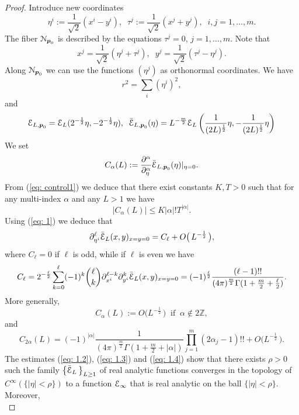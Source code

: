 \documentclass[reqno, 11pt]{amsart}
\theoremstyle{definition}
\numberwithin{equation}{section}
\begin{document}
\begin{proof}
Introduce   new coordinates 
\[
\eta^i:=\frac{1}{\sqrt{2}}(x^i-y^i), \;\;\tau^j:=\frac{1}{\sqrt{2}}(x^j+y^j),\;\; i,j=1,\dotsc, m.
\]
The  fiber ${\EuScript{N}}_{{{\boldsymbol{p}}}_0}$ is described by the  equations $\tau^j=0$, $j=1,\dotsc, m$.  Note that
\[
x^j =\frac{1}{\sqrt{2}}(\eta^j+\tau^j),\;\; y^j=\frac{1}{\sqrt{2}}(\tau^j-\eta^j).
\]
Along ${\EuScript{N}}_{{{\boldsymbol{p}}}_0}$  we can use the functions $(\eta^j)$ as orthonormal coordinates. We have 
\[
r^2=\sum_i(\eta^i)^2,
\]
and
\[
{\EuScript{E}}_{L,{{\boldsymbol{p}}}_0}= {\EuScript{E}}_L( 2^{-\frac{1}{2}} \eta, -2^{-\frac{1}{2}}\eta),\;\;\bar{\EuScript{E}}_{L,{{\boldsymbol{p}}}_0}(\eta)= L^{-\frac{m}{2}}{\EuScript{E}}_L\left( \frac{1}{(2L)^{\frac{1}{2}}} \eta, -\frac{1}{(2L)^{\frac{1}{2}}}\eta\right)
\]
We set
\[
C_{\alpha}(L):=\frac{{\partial}^\alpha}{{\partial}_\eta^\alpha}\bar{\EuScript{E}}_{L,{{\boldsymbol{p}}}_0}(\eta)|_{\eta=0}.
\]
From (\ref{eq: control1}) we deduce that there exist constants $K, T>0$  such that for any  multi-index $\alpha$ and any  $L>1$ we have 
\begin{equation}
\left|C_{\alpha}(L)\right|\leq K|\alpha|! T^{|\alpha|}.
\label{eq: 1.2}
\end{equation}
Using (\ref{eq: 1}) we deduce that
\[
{\partial}^\ell_{\eta^i} \bar{\EuScript{E}}_L(x,y)_{x=y=0}= C_\ell+O\bigl(\, L^{-\frac{1}{2}}\,\bigr),
\]
where $C_\ell=0$ if $\ell$ is odd, while if $\ell$ is even we have
\[
C_\ell=2^{-\frac{\ell}{2}}\sum_{k=0}^\ell (-1)^k \binom{\ell}{k} {\partial}^{\ell-k}_{x^i} {\partial}^k_{y^i} \bar{\EuScript{E}}_L(x,y)_{x=y=0}=(-1)^{\frac{\ell}{2}} \frac{(\ell-1)!!}{(4\pi)^{\frac{m}{2}} \Gamma( 1+\frac{m}{2}+\frac{\ell}{2})}.
\]
More generally,
\begin{equation}
C_{\alpha}(L):= O\bigl(L^{-\frac{1}{2}}\,\bigr)\;\;\mbox{if}\;\;\alpha\not\in 2{{\mathbb Z}},
\label{eq: 1.3}
\end{equation}
and 
\begin{equation}
C_{2\alpha}(L)=(-1)^{|\alpha|} \frac{1}{(4\pi)^{\frac{m}{2}} \Gamma( 1+\frac{m}{2}+|\alpha|)}\prod_{j=1}^m (2\alpha_j-1)!!+ O\bigl(L^{-\frac{1}{2}}\,\bigr).
\label{eq: 1.4}
\end{equation}
The   estimates  (\ref{eq: 1.2}),  (\ref{eq: 1.3}) and (\ref{eq: 1.4}) show that  there exists $\rho>0$  such  the family $\bigl\{ \bar{\EuScript{E}}_L\,\bigr\}_{L\geq 1}$ of real analytic functions   converges   in the topology of $C^\infty(\{|\eta|<\rho\})$ to a function ${\EuScript{E}}_\infty$ that is real analytic on the ball $\{|\eta|<\rho\}$. Moreover,
\begin{equation}

\end{equation}
\end{proof}
\end{document}
